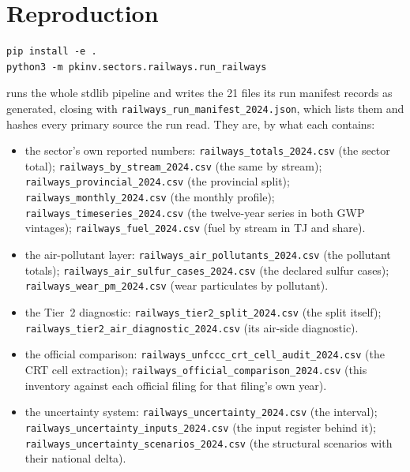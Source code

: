 \section{Reproduction}
\label{app:repro}

\begin{verbatim}
pip install -e .
python3 -m pkinv.sectors.railways.run_railways
\end{verbatim}

runs the whole stdlib pipeline and writes the \num{21} files its run manifest records as
generated, closing with \texttt{railways\_run\_manifest\_2024.json}, which lists them and
hashes every primary source the run read. They are, by what each contains:

\begin{itemize}\itemsep2pt
\item the sector's own reported numbers: \texttt{railways\_\allowbreak totals\_\allowbreak 2024.csv} (the sector total); \texttt{railways\_\allowbreak by\_\allowbreak stream\_\allowbreak 2024.csv} (the same by stream); \texttt{railways\_\allowbreak provincial\_\allowbreak 2024.csv} (the provincial split); \texttt{railways\_\allowbreak monthly\_\allowbreak 2024.csv} (the monthly profile); \texttt{railways\_\allowbreak timeseries\_\allowbreak 2024.csv} (the twelve-year series in both GWP vintages); \texttt{railways\_\allowbreak fuel\_\allowbreak 2024.csv} (fuel by stream in TJ and share).
\item the air-pollutant layer: \texttt{railways\_\allowbreak air\_\allowbreak pollutants\_\allowbreak 2024.csv} (the pollutant totals); \texttt{railways\_\allowbreak air\_\allowbreak sulfur\_\allowbreak cases\_\allowbreak 2024.csv} (the declared sulfur cases); \texttt{railways\_\allowbreak wear\_\allowbreak pm\_\allowbreak 2024.csv} (wear particulates by pollutant).
\item the Tier~2 diagnostic: \texttt{railways\_\allowbreak tier2\_\allowbreak split\_\allowbreak 2024.csv} (the split itself); \texttt{railways\_\allowbreak tier2\_\allowbreak air\_\allowbreak diagnostic\_\allowbreak 2024.csv} (its air-side diagnostic).
\item the official comparison: \texttt{railways\_\allowbreak unfccc\_\allowbreak crt\_\allowbreak cell\_\allowbreak audit\_\allowbreak 2024.csv} (the CRT cell extraction); \texttt{railways\_\allowbreak official\_\allowbreak comparison\_\allowbreak 2024.csv} (this inventory against each official filing for that filing's own year).
\item the uncertainty system: \texttt{railways\_\allowbreak uncertainty\_\allowbreak 2024.csv} (the interval); \texttt{railways\_\allowbreak uncertainty\_\allowbreak inputs\_\allowbreak 2024.csv} (the input register behind it); \texttt{railways\_\allowbreak uncertainty\_\allowbreak scenarios\_\allowbreak 2024.csv} (the structural scenarios with their national delta).

\end{itemize}
